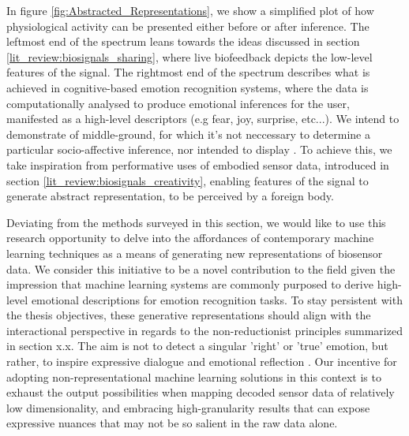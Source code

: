 In figure \ref{fig:Abstracted_Representations}, we show a simplified plot of how physiological activity can be presented either before or after inference. The leftmost end of the spectrum leans towards the ideas discussed in section \ref{lit_review:biosignals_sharing}, where live biofeedback depicts the low-level features of the signal. The rightmost end of the spectrum describes what is achieved in cognitive-based emotion recognition systems, where the data is computationally analysed to produce emotional inferences for the user, manifested as a high-level descriptors (e.g fear, joy, surprise, etc...). We intend to demonstrate of middle-ground, for which it's not neccessary to determine a particular socio-affective inference, nor intended to display . To achieve this, we take inspiration from performative uses of embodied sensor data, introduced in section \ref{lit_review:biosignals_creativity}, enabling features of the signal to generate abstract representation, to be perceived by a foreign body.

Deviating from the methods surveyed in this section, we would like to use this research opportunity to delve into the affordances of contemporary machine learning techniques as a means of generating new representations of biosensor data. We consider this initiative to be a novel contribution to the field given the impression that machine learning systems are commonly purposed to derive high-level emotional descriptions for emotion recognition tasks. To stay persistent with the thesis objectives, these generative representations should align with the interactional perspective in regards to the non-reductionist principles summarized in section x.x. The aim is not to detect a singular 'right' or 'true' emotion, but rather, to inspire expressive dialogue and emotional reflection \cite{hook_affective_2009}. Our incentive for adopting non-representational machine learning solutions in this context is to exhaust the output possibilities when mapping decoded sensor data of relatively low dimensionality, and embracing high-granularity results that can expose expressive nuances that may not be so salient in the raw data alone.



